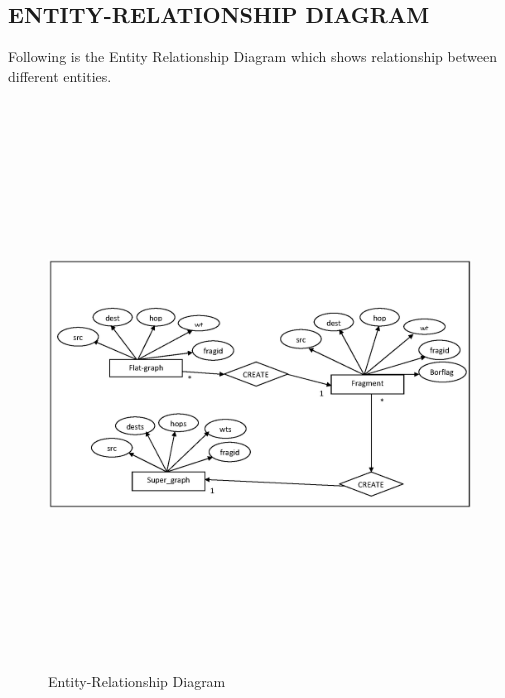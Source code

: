 \begin{center}
\section{\normalsize ENTITY-RELATIONSHIP DIAGRAM}
\hspace{5mm} Following is the Entity Relationship Diagram which shows relationship between different entities.
\begin{figure}[H]
\includegraphics[width=16cm,height=15cm]{ER1.eps}
\caption{Entity-Relationship Diagram}
\end{figure}


\newpage





\end{center}
